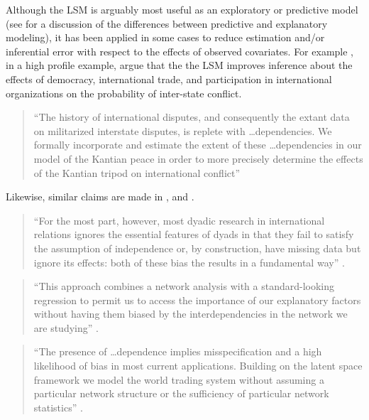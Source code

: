 \documentclass[11pt]{article}
\begin{document}

Although the LSM is arguably most useful as an exploratory or predictive model (see \citet{shmueli2010explain} for a discussion of the differences between predictive and explanatory modeling), it has been applied in some cases to reduce estimation and/or inferential error with respect to the effects of observed covariates. For example \citet{ward2007disputes}, in a high profile example, argue that the the LSM improves inference about the effects of democracy, international trade, and participation in international organizations on the probability of inter-state conflict.

\begin{quote}
``The history of international disputes, and consequently the extant data on militarized interstate disputes, is replete with \ldots dependencies. We formally incorporate and estimate the extent of these \ldots dependencies in our model of the Kantian peace in order to more precisely determine the effects of the Kantian tripod on international conflict'' \citep[p. 585]{ward2007disputes}
\end{quote}

Likewise, similar claims are made in \citet{dorff2013networks, cao2013democracies, ward2013gravity, kirkland2012multimember}, and \citet{cao2016transnational}.

\begin{quote}
``For the most part, however, most dyadic research in international relations ignores the essential features of dyads in that they fail to satisfy the assumption of independence or, by construction, have missing data but ignore its effects: both of these bias the results in a fundamental way'' \citep[p. 2]{dorff2013networks}.
\end{quote}

\begin{quote}
``This approach combines a network analysis with a standard-looking regression to permit us to access the importance of our explanatory factors without having them biased by the interdependencies in the network we are studying'' \citep[p. 15]{cao2013democracies}.
\end{quote}

\begin{quote}
``The presence of \ldots dependence implies misspecification and a high likelihood of bias in most current applications. Building on the latent space framework we model the world trading system without assuming a particular network structure or the sufficiency of particular network statistics'' \citep[p. 20]{ward2013gravity}.
\end{quote}
\end{document}

